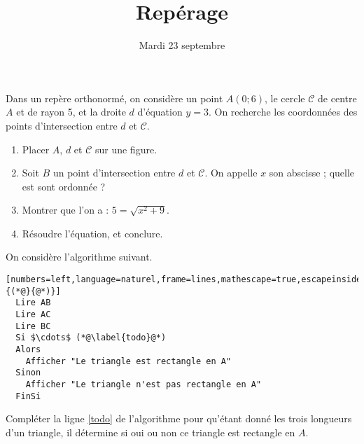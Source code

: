 \documentclass{article}
\title{Repérage}
\date{Mardi 23 septembre}
\begin{document}
\maketitle
\begin{exercice}
  Dans un repère orthonormé, on considère un point $A(0;6)$, le cercle $\mathcal{C}$ de centre $A$ et de rayon 5, et la droite $d$ d'équation $y=3$. On recherche les coordonnées des points d'intersection entre $d$ et $\mathcal{C}$.
  \begin{enumerate}
    \item Placer $A$, $d$ et $\mathcal{C}$ sur une figure.
    \item Soit $B$ un point d'intersection entre $d$ et $\mathcal{C}$. On appelle $x$ son abscisse ; quelle est sont ordonnée ?
    \item Montrer que l'on a : $5=\sqrt{x^2+9}$.
    \item Résoudre l'équation, et conclure.
  \end{enumerate}
\end{exercice}

\begin{exercice}[Algorithmique]
  On considère l'algorithme suivant.
  \begin{lstlisting}[numbers=left,language=naturel,frame=lines,mathescape=true,escapeinside={(*@}{@*)}]
  Lire AB
  Lire AC
  Lire BC
  Si $\cdots$ (*@\label{todo}@*)
  Alors
    Afficher "Le triangle est rectangle en A"
  Sinon
    Afficher "Le triangle n'est pas rectangle en A"
  FinSi
  \end{lstlisting}

  Compléter la ligne \ref{todo} de l'algorithme pour qu'étant donné les trois longueurs d'un triangle, il détermine si oui ou non ce triangle est rectangle en $A$.

\end{exercice}
\end{document}
